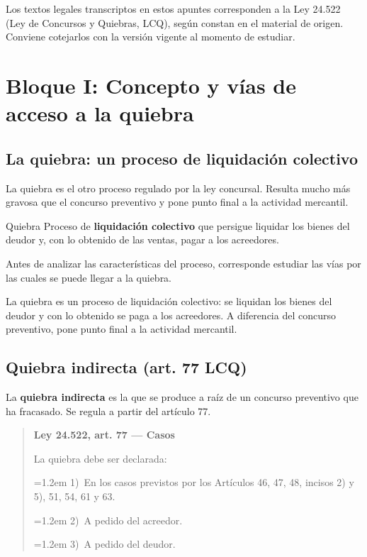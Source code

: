 \documentclass[12pt,oneside]{book}
\newenvironment{articulo}[1]
  {\begin{quote}\small\textbf{#1}\par\smallskip}
  {\end{quote}}
\newcommand{\inciso}[2]{\par\noindent\hangindent=1.2em\hangafter=1 #1)~#2}
\begin{document}
\begin{note}
Los textos legales transcriptos en estos apuntes corresponden a la Ley 24.522 (Ley de Concursos y Quiebras, LCQ), según constan en el material de origen. Conviene cotejarlos con la versión vigente al momento de estudiar.
\end{note}

\chapter[Concepto y vías de acceso]{Bloque I: Concepto y vías de acceso a la quiebra}

\section{La quiebra: un proceso de liquidación colectivo}

La quiebra es el otro proceso regulado por la ley concursal. Resulta mucho más gravosa que el concurso preventivo y pone punto final a la actividad mercantil.

\begin{definition}{Quiebra}
Proceso de \textbf{liquidación colectivo} que persigue liquidar los bienes del deudor y, con lo obtenido de las ventas, pagar a los acreedores.
\end{definition}

Antes de analizar las características del proceso, corresponde estudiar las vías por las cuales se puede llegar a la quiebra.

\begin{important}
La quiebra es un proceso de liquidación colectivo: se liquidan los bienes del deudor y con lo obtenido se paga a los acreedores. A diferencia del concurso preventivo, pone punto final a la actividad mercantil.
\end{important}

\section{Quiebra indirecta (art. 77 LCQ)}

La \textbf{quiebra indirecta} es la que se produce a raíz de un concurso preventivo que ha fracasado. Se regula a partir del artículo 77.

\begin{articulo}{Ley 24.522, art. 77 --- Casos}
La quiebra debe ser declarada:
\inciso{1}{En los casos previstos por los Artículos 46, 47, 48, incisos 2) y 5), 51, 54, 61 y 63.}
\inciso{2}{A pedido del acreedor.}
\inciso{3}{A pedido del deudor.}
\end{articulo}
\end{document}
